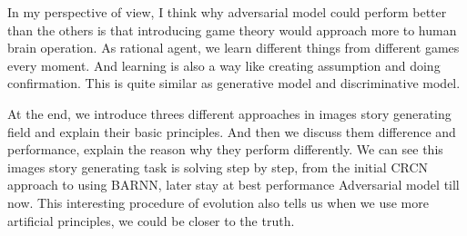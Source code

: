 \documentclass[11pt]{article}
\begin{document}
In my perspective of view, I think why adversarial model could perform better than the others is that introducing game theory would approach more to human brain operation. As rational agent, we learn different things from different games every moment. And learning is also a way like creating assumption and doing confirmation. This is quite similar as generative model and discriminative model.

At the end, we introduce threes different approaches in images story generating field and explain their basic principles. And then we discuss them difference and performance, explain the reason why they perform differently. We can see this images story generating task is solving step by step, from the initial CRCN approach to using BARNN, later stay at best performance Adversarial model till now. This interesting procedure of evolution also tells us when we use more artificial principles, we could be closer to the truth. 




\end{document}
